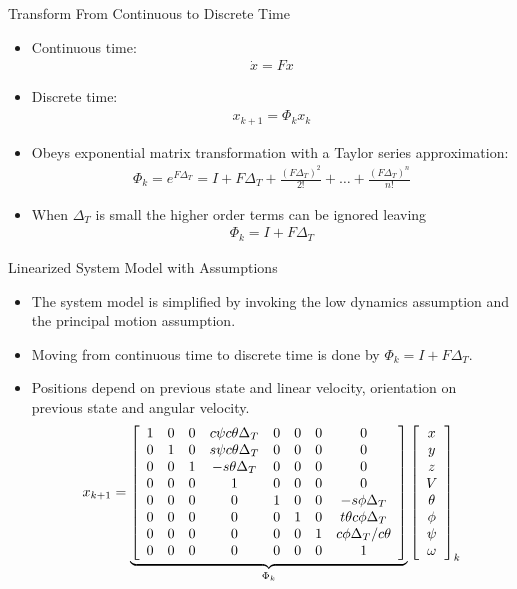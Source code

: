 \documentclass[hyperref={pdfpagelabels=false}]{beamer}
\begin{document}
\begin{frame}{Transform From Continuous to Discrete Time}
\begin{itemize}
\item Continuous time:
\begin{align*}
\dot{x} = Fx
\end{align*}
\item Discrete time:
\begin{align*}
x_{k+1} = \Phi_kx_k
\end{align*}
\item Obeys exponential matrix transformation with a Taylor series approximation:
\begin{align*}
\Phi_k = e^{F\Delta_T} = I + F\Delta_T + \frac{(F\Delta_T)^2}{2!} + \ldots + \frac{(F\Delta_T)^n}{n!}
\end{align*}
\item When $\Delta_T$ is small the higher order terms can be ignored leaving
\begin{align*}
\Phi_k = I + F\Delta_T
\end{align*}
\end{itemize}
\end{frame}

\begin{frame}{Linearized System Model with Assumptions}
\begin{itemize}
\item The system model is simplified by invoking the low dynamics assumption and the principal motion assumption.
\item Moving from continuous time to discrete time is done by $\Phi_k = I + F\Delta_T$.
\item Positions depend on previous state and linear velocity, orientation on previous state and angular velocity.
\begin{align*}
x_{k+1} = 
\underbrace{\left[\begin{array}{c c c c c c c c}
1 & 0 & 0 & c\psi c\theta \Delta_T & 0 & 0 & 0 & 0 \\
0 & 1 & 0 & s\psi c\theta \Delta_T & 0 & 0 & 0 & 0\\
0 & 0 & 1 & -s\theta \Delta_T & 0 & 0 & 0 & 0\\
0 & 0 & 0 & 1 & 0 & 0 & 0 & 0 \\
0 & 0 & 0 & 0 & 1 & 0 & 0 & -s\phi \Delta_T \\
0 & 0 & 0 & 0 & 0 & 1 & 0 & t\theta c\phi \Delta_T \\
0 & 0 & 0 & 0 & 0 & 0 & 1 & c\phi \Delta_T/c\theta \\
0 & 0 & 0 & 0 & 0 & 0 & 0 & 1
\end{array}\right]}_{\Phi_k}
\left[\begin{array}{c}
x \\ y \\ z \\ V \\ \theta \\ \phi \\ \psi \\ \omega
\end{array}\right]_k
\end{align*}
\end{itemize}
\end{frame}
\end{document}
